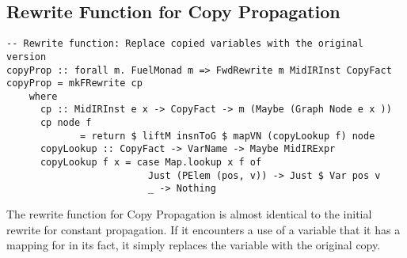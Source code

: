 \documentclass[11pt]{article}
\begin{document}
\subsection { Rewrite Function for Copy Propagation }

\begin{verbatim}
-- Rewrite function: Replace copied variables with the original version 
copyProp :: forall m. FuelMonad m => FwdRewrite m MidIRInst CopyFact 
copyProp = mkFRewrite cp 
    where 
      cp :: MidIRInst e x -> CopyFact -> m (Maybe (Graph Node e x ))
      cp node f 
             = return $ liftM insnToG $ mapVN (copyLookup f) node 
      copyLookup :: CopyFact -> VarName -> Maybe MidIRExpr 
      copyLookup f x = case Map.lookup x f of 
                         Just (PElem (pos, v)) -> Just $ Var pos v 
                         _ -> Nothing
\end{verbatim}

The rewrite function for Copy Propagation is almost identical to the initial rewrite for constant propagation. If it encounters a use of a variable that it has a mapping for in its fact, it simply replaces the variable with the original copy. 
\end{document}

